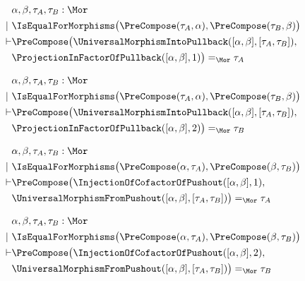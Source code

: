 \begin{sequent}
\begin{align*}
  &\alpha, \beta, \tau_A, \tau_B:\Mor \\
  |~ &\IsEqualForMorphisms\big( \PreCompose( \tau_A, \alpha ), \PreCompose( \tau_B, \beta ) \big)\\
  \vdash &\PreCompose\big( \UniversalMorphismIntoPullback( [\alpha, \beta], [\tau_A, \tau_B] ), \\
  &\ProjectionInFactorOfPullback( [\alpha, \beta], 1 ) \big) =_{\Mor} \tau_A
\end{align*}
\end{sequent}

\begin{sequent}
\begin{align*}
  &\alpha, \beta, \tau_A, \tau_B:\Mor \\
  |~ &\IsEqualForMorphisms\big( \PreCompose( \tau_A, \alpha ), \PreCompose( \tau_B, \beta ) \big)\\
  \vdash &\PreCompose\big( \UniversalMorphismIntoPullback( [\alpha, \beta], [\tau_A, \tau_B] ), \\
  &\ProjectionInFactorOfPullback( [\alpha, \beta], 2 ) \big) =_{\Mor} \tau_B
\end{align*}
\end{sequent}

\begin{sequent}
\begin{align*}
  &\alpha, \beta, \tau_A, \tau_B:\Mor \\
  |~ &\IsEqualForMorphisms\big( \PreCompose( \alpha, \tau_A ), \PreCompose( \beta, \tau_B) \big)\\
  \vdash &\PreCompose\big( \InjectionOfCofactorOfPushout( [\alpha, \beta], 1 ), \\
  &\UniversalMorphismFromPushout( [\alpha, \beta], [\tau_A, \tau_B] )\big) =_{\Mor} \tau_A
\end{align*}
\end{sequent}

\begin{sequent}
\begin{align*}
  &\alpha, \beta, \tau_A, \tau_B:\Mor \\
  |~ &\IsEqualForMorphisms\big( \PreCompose( \alpha, \tau_A ), \PreCompose( \beta, \tau_B) \big)\\
  \vdash &\PreCompose\big( \InjectionOfCofactorOfPushout( [\alpha, \beta], 2 ), \\
  &\UniversalMorphismFromPushout( [\alpha, \beta], [\tau_A, \tau_B] )\big) =_{\Mor} \tau_B
\end{align*}
\end{sequent}
